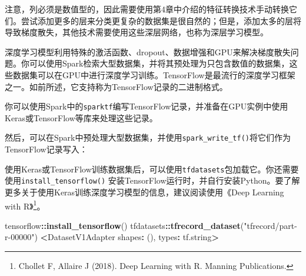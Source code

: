 \documentclass[
]{article}
\newenvironment{Shaded}{\begin{snugshade}}{\end{snugshade}}
\newcommand{\DataTypeTok}[1]{\textcolor[rgb]{0.13,0.29,0.53}{#1}}
\newcommand{\KeywordTok}[1]{\textcolor[rgb]{0.13,0.29,0.53}{\textbf{#1}}}
\newcommand{\NormalTok}[1]{#1}
\newcommand{\OperatorTok}[1]{\textcolor[rgb]{0.81,0.36,0.00}{\textbf{#1}}}
\newcommand{\StringTok}[1]{\textcolor[rgb]{0.31,0.60,0.02}{#1}}
\begin{document}
注意，列必须是数值型的，因此需要使用第4章中介绍的特征转换技术手动转换它们。尝试添加更多的层来分类更复杂的数据集是很自然的；但是，添加太多的层将导致梯度散失，其他技术需要使用这些深层网络，也称为深层学习模型。

深度学习模型利用特殊的激活函数、dropout、数据增强和GPU来解决梯度散失问题。你可以使用Spark检索大型数据集，并将其预处理为只包含数值的数据集，这些数据集可以在GPU中进行深度学习训练。TensorFlow是最流行的深度学习框架之一。如前所述，它支持称为TensorFlow记录的二进制格式。

你可以使用Spark中的\texttt{sparktf}编写TensorFlow记录，并准备在GPU实例中使用Keras或TensorFlow等库来处理这些记录。

然后，可以在Spark中预处理大型数据集，并使用\texttt{spark\_write\_tf()}将它们作为TensorFlow记录写入：

\begin{Shaded}
\end{Shaded}

使用Keras或TensorFlow训练数据集后，可以使用\texttt{tfdatasets}包加载它。你还需要使用\texttt{install\_tensorflow()}
安装TensorFlow运行时，并自行安装Python。要了解更多关于使用Keras训练深度学习模型的信息，建议阅读使用《Deep
Learning with R》\footnote{Chollet F, Allaire J (2018). Deep Learning
  with R. Manning Publications.}。

\begin{Shaded}
\begin{Highlighting}[]
\NormalTok{tensorflow}\OperatorTok{::}\KeywordTok{install_tensorflow}\NormalTok{()}
\NormalTok{tfdatasets}\OperatorTok{::}\KeywordTok{tfrecord_dataset}\NormalTok{(}\StringTok{"tfrecord/part-r-00000"}\NormalTok{)}
\OperatorTok{<}\NormalTok{DatasetV1Adapter shapes}\OperatorTok{:}\StringTok{ }\NormalTok{(), types}\OperatorTok{:}\StringTok{ }\NormalTok{tf.string}\OperatorTok{>}
\end{Highlighting}
\end{Shaded}
\end{document}
